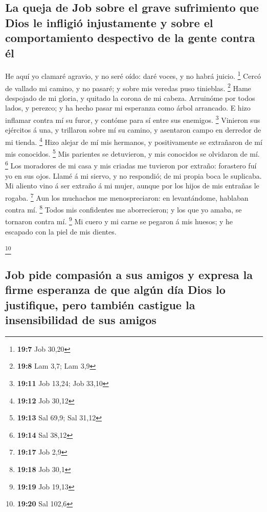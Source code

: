 \hypertarget{la-queja-de-job-sobre-el-grave-sufrimiento-que-dios-le-infligiuxf3-injustamente-y-sobre-el-comportamiento-despectivo-de-la-gente-contra-uxe9l}{%
\subsection{La queja de Job sobre el grave sufrimiento que Dios le
infligió injustamente y sobre el comportamiento despectivo de la gente
contra
él}\label{la-queja-de-job-sobre-el-grave-sufrimiento-que-dios-le-infligiuxf3-injustamente-y-sobre-el-comportamiento-despectivo-de-la-gente-contra-uxe9l}}

 He aquí yo clamaré agravio, y no seré oído: daré voces, y
no habrá juicio. \footnote{\textbf{19:7} Job 30,20}  Cercó
de vallado mi camino, y no pasaré; y sobre mis veredas puso tinieblas.
\footnote{\textbf{19:8} Lam 3,7; Lam 3,9}  Hame despojado
de mi gloria, y quitado la corona de mi cabeza. 
Arruinóme por todos lados, y perezco; y ha hecho pasar mi esperanza como
árbol arrancado.  E hizo inflamar contra mí su furor, y
contóme para sí entre sus enemigos. \footnote{\textbf{19:11} Job 13,24;
  Job 33,10}  Vinieron sus ejércitos á una, y trillaron
sobre mí su camino, y asentaron campo en derredor de mi tienda.
\footnote{\textbf{19:12} Job 30,12}  Hizo alejar de mí
mis hermanos, y positivamente se extrañaron de mí mis conocidos.
\footnote{\textbf{19:13} Sal 69,9; Sal 31,12}  Mis
parientes se detuvieron, y mis conocidos se olvidaron de mí. \footnote{\textbf{19:14}
  Sal 38,12}  Los moradores de mi casa y mis criadas me
tuvieron por extraño: forastero fuí yo en sus ojos. 
Llamé á mi siervo, y no respondió; de mi propia boca le suplicaba.
 Mi aliento vino á ser extraño á mi mujer, aunque por los
hijos de mis entrañas le rogaba. \footnote{\textbf{19:17} Job 2,9}
 Aun los muchachos me menospreciaron: en levantándome,
hablaban contra mí. \footnote{\textbf{19:18} Job 30,1} 
Todos mis confidentes me aborrecieron; y los que yo amaba, se tornaron
contra mí. \footnote{\textbf{19:19} Job 19,13}  Mi cuero
y mi carne se pegaron á mis huesos; y he escapado con la piel de mis
dientes.

\footnote{\textbf{19:20} Sal 102,6}

\hypertarget{job-pide-compasiuxf3n-a-sus-amigos-y-expresa-la-firme-esperanza-de-que-alguxfan-duxeda-dios-lo-justifique-pero-tambiuxe9n-castigue-la-insensibilidad-de-sus-amigos}{%
\subsection{Job pide compasión a sus amigos y expresa la firme esperanza
de que algún día Dios lo justifique, pero también castigue la
insensibilidad de sus
amigos}\label{job-pide-compasiuxf3n-a-sus-amigos-y-expresa-la-firme-esperanza-de-que-alguxfan-duxeda-dios-lo-justifique-pero-tambiuxe9n-castigue-la-insensibilidad-de-sus-amigos}}

